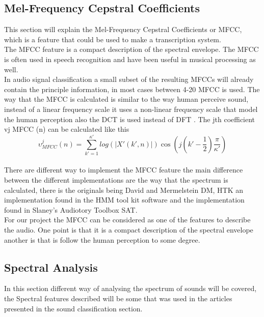 \subsection{Mel-Frequency Cepstral Coefficients}
This section will explain the Mel-Frequency Cepstral Coefficients or MFCC, which is a feature that could be used to make a transcription system. \\
The MFCC feature is a compact description of the spectral envelope. The MFCC is often used in speech recognition and have been useful in musical processing as well\citep{ACA}. \\ 
In audio signal classification a small subset of the resulting MFCCs will already contain the principle information, in most cases between 4-20 MFCC is used. The way that the MFCC is calculated is  similar to the way human perceive sound, instead of a linear frequency scale it uses a non-linear frequency scale that model the human perception also the DCT is used instead of DFT \citep{ACA}. The jth coefficient vj  MFCC (n) can be calculated like this\citep{ACA}\\
\begin{equation}\label{ eq:MFCC calculation}
  \upsilon ^j  _{MFCC} (n) = \sum_{k'=1}^{\kappa'} log(\vert X' (k',n) \vert)\cos(j(k' - \frac{1}{2})\frac{\pi}{\kappa'})
\end{equation}
\\
There are different way to implement the MFCC feature the main difference between the different implementations are the way that the spectrum is calculated, there is the originals being David and Mermelstein DM, HTK an implementation found in the HMM tool kit software and the implementation found in Slaney's Audiotory Toolbox SAT\citep{Slaney}.
\\
For our project the MFCC can be considered as one of the features to describe the audio. One point is that it is a compact description of the spectral envelope another is that is follow the human perception to some degree.
\subsection{Spectral Analysis}
In this section different way of analysing the spectrum of sounds will be covered, the Spectral features described will be some that was used in the articles presented in the sound classification section.
